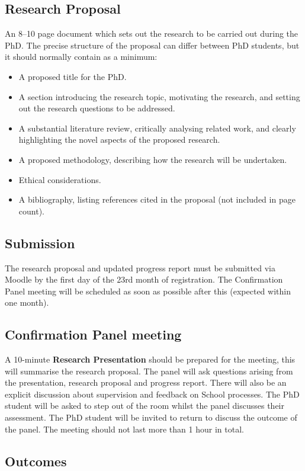 \documentclass[12pt,a4paper]{article}
\begin{document}
\subsection{Research Proposal}
An 8--10 page document which sets out the research to be carried out during the PhD. The precise structure of the proposal can differ between PhD students, but it should normally contain as a minimum:
\begin{itemize}
	\item A proposed title for the PhD.
	\item A section introducing the research topic, motivating the research, and setting out the research questions to be addressed.
	\item A substantial literature review, critically analysing related work, and clearly highlighting the novel aspects of the proposed research.
	\item A proposed methodology, describing how the research will be undertaken.
	\item Ethical considerations.
	\item A bibliography, listing references cited in the proposal (not included in page count).
\end{itemize}

\subsection{Submission}
The research proposal and updated progress report must be submitted via Moodle by the first day of the 23rd month of registration. The Confirmation Panel meeting will be scheduled as soon as possible after this (expected within one month).

\subsection{Confirmation Panel meeting}
A 10-minute \textbf{Research Presentation} should be prepared for the meeting, this will summarise the research proposal. The panel will ask questions arising from the presentation, research proposal and progress report. There will also be an explicit discussion about supervision and feedback on School processes. The PhD student will be asked to step out of the room whilst the panel discusses their assessment. The PhD student will be invited to return to discuss the outcome of the panel. The meeting should not last more than 1 hour in total.

\subsection{Outcomes}
\end{document}
